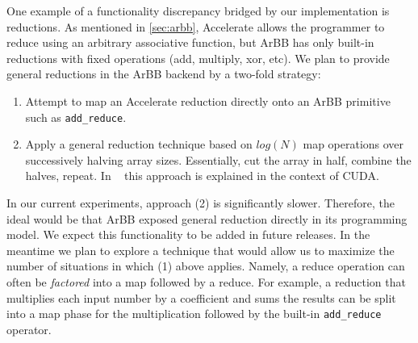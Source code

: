 \documentclass[conference]{IEEEtran}
\newcommand{\cde}[1]{{\footnotesize \tt #1}}
\newcommand{\textred}[1]{\textcolor{red}{#1}}
\newcommand{\pgwrapper}[2]{\textred{#1: #2}}
\newcommand{\textred}[1]{#1}
\newcommand{\pgwrapper}[2]{}
\newcommand{\rn}[1]{\pgwrapper{RRN}{#1}}
\begin{document}
%

One example of a functionality discrepancy bridged by our
implementation is reductions.  As mentioned in \ref{sec:arbb},
Accelerate allows the programmer to reduce using an arbitrary
associative function, but ArBB has only built-in reductions with fixed
operations (add, multiply, xor, etc). We plan to provide general reductions in
the ArBB backend by a two-fold strategy:

\begin{enumerate}
\item Attempt to map an Accelerate reduction directly onto an ArBB
  primitive such as \cde{add\_reduce}.
\item Apply a general reduction technique based on $log(N)$ map
  operations over successively halving array sizes.  Essentially, cut
  the array in half, combine the halves, repeat. In ~\cite{reduction}
  this approach is explained in the context of CUDA. 
\end{enumerate}


In our current experiments, approach (2) is significantly slower.
Therefore, the ideal would be that ArBB exposed general reduction
directly in its programming model.  We expect this functionality to be
added in future releases.  In the meantime we plan to explore a
technique that would allow us to maximize the number of situations in
which (1) above applies.  Namely, a reduce operation can often be {\em
  factored} into a map followed by a reduce.  For example, a reduction
that multiplies each input number by a coefficient and sums the
results can be split into a map phase for the multiplication followed
by the built-in \cde {add\_reduce} operator.
\end{document}
